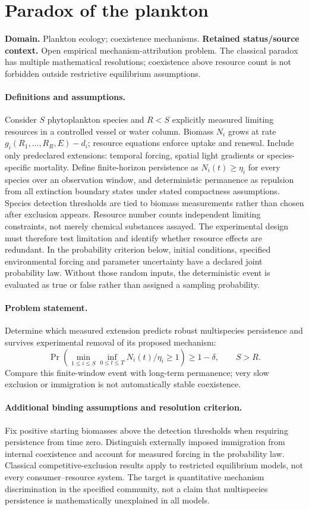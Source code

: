 \documentclass[11pt]{article}
\begin{document}
\section*{Paradox of the plankton}
\label{prob:190}
\label{rank:169}
\par\smallskip

\noindent\textbf{Domain.} Plankton ecology; coexistence mechanisms. \quad \textbf{Retained status/source context.} Open empirical mechanism-attribution problem. The classical paradox has multiple mathematical resolutions; coexistence above resource count is not forbidden outside restrictive equilibrium assumptions.
\paragraph{Definitions and assumptions.} Consider $S$ phytoplankton species and $R<S$ explicitly measured limiting resources in a controlled vessel or water column. Biomass $N_i$ grows at rate $g_i(R_1,\ldots,R_R,E)-d_i$; resource equations enforce uptake and renewal. Include only predeclared extensions: temporal forcing, spatial light gradients or species-specific mortality. Define finite-horizon persistence as $N_i(t)\ge\eta_i$ for every species over an observation window, and deterministic permanence as repulsion from all extinction boundary states under stated compactness assumptions. Species detection thresholds are tied to biomass measurements rather than chosen after exclusion appears. Resource number counts independent limiting constraints, not merely chemical substances assayed. The experimental design must therefore test limitation and identify whether resource effects are redundant. In the probability criterion below, initial conditions, specified environmental forcing and parameter uncertainty have a declared joint probability law. Without those random inputs, the deterministic event is evaluated as true or false rather than assigned a sampling probability.
\paragraph{Problem statement.} Determine which measured extension predicts robust multispecies persistence and survives experimental removal of its proposed mechanism:
\[
 \Pr\!\left(\min_{1\le i\le S}\inf_{0\le t\le T}
 N_i(t)/\eta_i\ge1\right)\ge1-\delta,
 \qquad S>R.
\]
Compare this finite-window event with long-term permanence; very slow exclusion or immigration is not automatically stable coexistence.
\paragraph{Additional binding assumptions and resolution criterion.} Fix positive starting biomasses above the detection thresholds when requiring persistence from time zero. Distinguish externally imposed immigration from internal coexistence and account for measured forcing in the probability law. Classical competitive-exclusion results apply to restricted equilibrium models, not every consumer--resource system. The target is quantitative mechanism discrimination in the specified community, not a claim that multispecies persistence is mathematically unexplained in all models.
\end{document}

